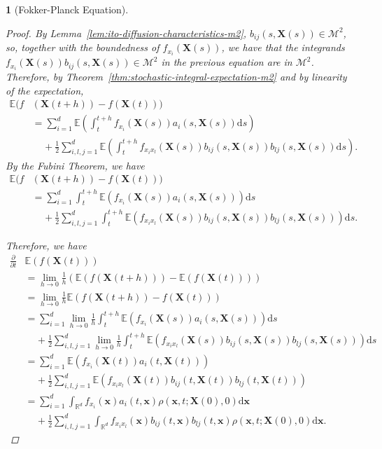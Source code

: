 \documentclass[english]{article}
\numberwithin{equation}{section}
\numberwithin{figure}{section}
\theoremstyle{bolddescit}
\newtheorem{theorem}{\protect\theoremname}[section]
\theoremstyle{definition}
\theoremstyle{definition}
\theoremstyle{plain}
\theoremstyle{plain}
\theoremstyle{bolddesc}
\theoremstyle{plain}
\theoremstyle{remark}
\providecommand{\theoremname}{Theorem}
\begin{document}
\begin{theorem}[Fokker-Planck Equation]
\begin{proof}
    By Lemma~\ref{lem:ito-diffusion-characteristics-m2}, $b_{ij}(s,\mathbf{X}(s)) \in \mathcal{M}^2$, so, together with the boundedness of $f_{x_i}(\mathbf{X}(s))$, we have that the integrands $f_{x_i}(\mathbf{X}(s))b_{ij}(s,\mathbf{X}(s)) \in \mathcal{M}^2$ in the previous equation are in $\mathcal{M}^2$. Therefore, by Theorem~\ref{thm:stochastic-integral-expectation-m2} and by linearity of the expectation,
    \begin{align*}
      \mathbb{E}(f&(\mathbf{X}(t+h)) - f(\mathbf{X}(t)))\\
      &= \sum_{i=1}^{d} \mathbb{E}\left(\int_t^{t+h} f_{x_i}(\mathbf{X}(s)) a_i(s,\mathbf{X}(s)) \mathrm{d}s\right)\\
        &\ \ \ \ \ + \frac{1}{2} \sum_{i,l,j=1}^{d} \mathbb{E}\left(\int_t^{t+h} f_{x_i x_l}(\mathbf{X}(s)) b_{ij}(s,\mathbf{X}(s)) b_{lj}(s,\mathbf{X}(s)) \mathrm{d}s\right).
    \end{align*}
    By the Fubini Theorem, we have
    \begin{align*}
      \mathbb{E}(f&(\mathbf{X}(t+h)) - f(\mathbf{X}(t)))\\
      &= \sum_{i=1}^{d} \int_t^{t+h} \mathbb{E}(f_{x_i}(\mathbf{X}(s)) a_i(s,\mathbf{X}(s))) \mathrm{d}s\\
        &\ \ \ \ \ + \frac{1}{2} \sum_{i,l,j=1}^{d} \int_t^{t+h} \mathbb{E}\left(f_{x_i x_l}(\mathbf{X}(s)) b_{ij}(s,\mathbf{X}(s)) b_{lj}(s,\mathbf{X}(s))\right) \mathrm{d}s.
    \end{align*}

    Therefore, we have
    \begin{align*}
      \frac{\partial}{\partial t}&\mathbb{E}(f(\mathbf{X}(t)))\\
      &= \lim_{h \to 0} \frac{1}{h} (\mathbb{E}(f(\mathbf{X}(t+h))) - \mathbb{E}(f(\mathbf{X}(t))))\\
      &= \lim_{h \to 0} \frac{1}{h} \mathbb{E}(f(\mathbf{X}(t+h)) - f(\mathbf{X}(t))) \tag{linearity}\\
      &= \sum_{i=1}^{d} \lim_{h \to 0} \frac{1}{h} \int_t^{t+h} \mathbb{E}(f_{x_i}(\mathbf{X}(s)) a_i(s,\mathbf{X}(s))) \mathrm{d}s\\
        &\ \ \ \ \ + \frac{1}{2} \sum_{i,l,j=1}^{d} \lim_{h \to 0} \frac{1}{h} \int_t^{t+h} \mathbb{E}\left(f_{x_i x_l}(\mathbf{X}(s)) b_{ij}(s,\mathbf{X}(s)) b_{lj}(s,\mathbf{X}(s))\right) \mathrm{d}s\\
      &= \sum_{i=1}^{d} \mathbb{E}(f_{x_i}(\mathbf{X}(t)) a_i(t,\mathbf{X}(t)))\\
        &\ \ \ \ \ + \frac{1}{2} \sum_{i,l,j=1}^{d} \mathbb{E}\left(f_{x_i x_l}(\mathbf{X}(t)) b_{ij}(t,\mathbf{X}(t)) b_{lj}(t,\mathbf{X}(t))\right)\\
      &= \sum_{i=1}^{d} \int_{\mathbb{R}^d} f_{x_i}(\mathbf{x}) a_i(t,\mathbf{x})\rho(\mathbf{x},t;\mathbf{X}(0),0) \mathrm{d}\mathbf{x}\\
        &\ \ \ \ \ + \frac{1}{2} \sum_{i,l,j=1}^{d} \int_{\mathbb{R}^d} f_{x_i x_l}(\mathbf{x}) b_{ij}(t,\mathbf{x}) b_{lj}(t,\mathbf{x}) \rho(\mathbf{x},t;\mathbf{X}(0),0) \mathrm{d}\mathbf{x}.
    \end{align*}


\end{proof}
\end{theorem}
\end{document}
